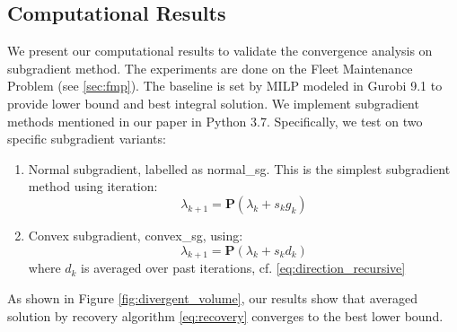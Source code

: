 \documentclass[../main]{subfiles}
\begin{document}









\subsection{Computational Results}\label{dual.computational-results}

We present our computational results to validate the convergence analysis on subgradient method.
The experiments are done on the Fleet Maintenance Problem (see \ref{sec:fmp}).
The baseline is set by MILP modeled in Gurobi 9.1 to provide lower bound and best integral solution.
We implement subgradient methods mentioned in our paper in Python 3.7. Specifically, we test on two specific subgradient variants:

\begin{enumerate}
  \item Normal subgradient, labelled as \textsf{normal\_sg}. This is the simplest subgradient method using iteration:
        \[\lambda_{k+1} = \mathbf{P}(\lambda_{k} + s_{k}g_{k})\]
  \item Convex subgradient, \textsf{convex\_sg}, using:
        \[\lambda_{k+1} = \mathbf{P}(\lambda_{k} + s_{k}d_{k})\]
        where \(d_k\) is averaged over past iterations, cf. \eqref{eq:direction_recursive}
\end{enumerate}

As shown in Figure \ref{fig:divergent_volume}, our results show that averaged solution by recovery algorithm \eqref{eq:recovery} converges to the best lower bound.
\end{document}
